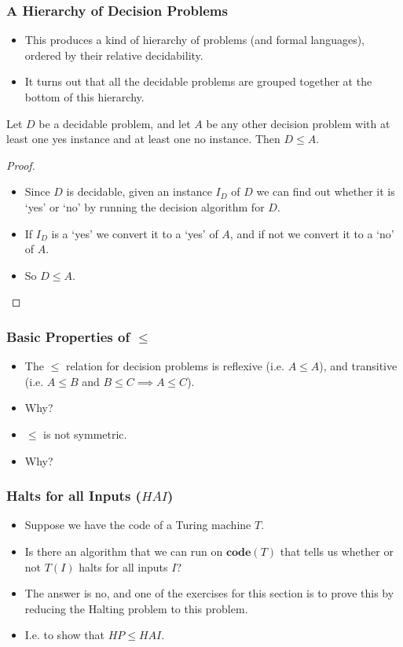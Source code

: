 \documentclass[handout]{beamer}
\newcommand{\co}{\mathbf{code}}
\begin{document}
\begin{frame}
\frametitle{A Hierarchy of Decision Problems}
\begin{itemize}
\item This produces a kind of hierarchy of problems (and formal languages), ordered by their relative decidability. 
\item It turns out that all the decidable problems are grouped together at the bottom of this hierarchy. 
\end{itemize}
\begin{theorem}
Let $D$ be a decidable problem, and let $A$ be any other decision problem with at least one yes instance and at least one no instance. Then $D\leq A$.
\end{theorem}
\begin{proof}
\begin{itemize}
\item Since $D$ is decidable, given an instance $I_D$ of $D$ we can find out whether it is `yes' or `no' by running the decision algorithm for $D$. 
\item If $I_D$ is a `yes' we convert it to a `yes' of $A$, and if not we convert it to a `no' of $A$. 
\item So $D\leq A$.
\end{itemize}
\end{proof}
\end{frame}

\begin{frame}
\frametitle{Basic Properties of $\leq$}
\begin{itemize}
\item The $\leq$ relation for decision problems is reflexive (i.e. $A\leq A$), and transitive (i.e. $A\leq B$ and $B\leq C\implies A\leq C$).
\vspace{0.4cm}
\item Why?
\vspace{0.4cm}
\item  $\leq$ is not symmetric.
\vspace{0.4cm}
\item Why?
\end{itemize}
\end{frame}

\begin{frame}
\frametitle{Halts for all Inputs ($HAI$)}
\begin{itemize}
\item Suppose we have the code of a Turing machine $T$. 
\vspace{0.4cm}
\item Is there an algorithm that we can run on $\co(T)$ that tells us whether or not $T(I)$ halts for all inputs $I$? 
\vspace{0.4cm}
\item The answer is no, and one of the exercises for this section is to prove this by reducing the Halting problem to this problem.
\vspace{0.4cm}
\item I.e. to show that $HP\leq HAI$.
\end{itemize} 
\end{frame}
\end{document}
